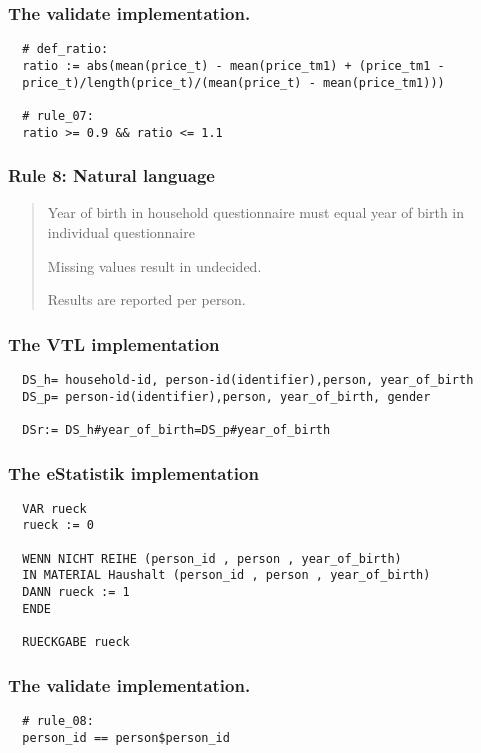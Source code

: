 \subsubsection*{The validate implementation.}
\begin{verbatim}
  # def_ratio:
  ratio := abs(mean(price_t) - mean(price_tm1) + (price_tm1 -
  price_t)/length(price_t)/(mean(price_t) - mean(price_tm1)))

  # rule_07:
  ratio >= 0.9 && ratio <= 1.1
\end{verbatim}


\newpage

\subsubsection*{  Rule 8: Natural language}
\begin{quote}


Year of birth in household questionnaire must equal year of birth in individual questionnaire

Missing values result in undecided.

Results are reported per person.


\end{quote}
\subsubsection*{The VTL implementation}
\begin{verbatim}
  DS_h= household-id, person-id(identifier),person, year_of_birth
  DS_p= person-id(identifier),person, year_of_birth, gender

  DSr:= DS_h#year_of_birth=DS_p#year_of_birth
\end{verbatim}
\subsubsection*{The eStatistik implementation}
\begin{verbatim}
  VAR rueck
  rueck := 0

  WENN NICHT REIHE (person_id , person , year_of_birth)
  IN MATERIAL Haushalt (person_id , person , year_of_birth)
  DANN rueck := 1
  ENDE

  RUECKGABE rueck
\end{verbatim}
\subsubsection*{The validate implementation.}
\begin{verbatim}
  # rule_08:
  person_id == person$person_id
\end{verbatim}


